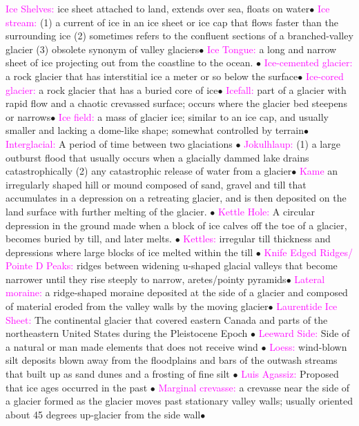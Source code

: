 \documentclass{article}
\newcommand{\ddd}{$\bullet$}
\newcommand{\pink}[1]{\textcolor{magenta}{#1}}
\newcommand{\vocab}[1]{{\pink{#1}}}
\begin{document}
\begin{multicols*}{4}
		\vocab{ Ice Shelves: }ice sheet attached to land, extends over sea, floats on water\ddd
		\vocab{        Ice stream: } (1) a current of ice in an ice sheet or ice cap that flows faster than the surrounding ice (2) sometimes refers to the confluent sections of a branched-valley glacier (3) obsolete synonym of valley glaciers\ddd
		\vocab{Ice Tongue: } a long and narrow sheet of ice projecting out from the coastline to the ocean. \ddd
		\vocab{        Ice-cemented glacier: } a rock glacier that has interstitial ice a meter or so below the surface\ddd
		\vocab{        Ice-cored glacier: } a rock glacier that has a buried core of ice\ddd
		\vocab{        Icefall: } part of a glacier with rapid flow and a chaotic crevassed surface; occurs where the glacier bed steepens or narrows\ddd
		\vocab{        Ice field: } a mass of glacier ice; similar to an ice cap, and usually smaller and lacking a dome-like shape; somewhat controlled by terrain\ddd
		\vocab{Interglacial: } A period of time between two glaciations \ddd
		\vocab{        Jokulhlaup: } (1) a large outburst flood that usually occurs when a glacially dammed lake drains catastrophically (2) any catastrophic release of water from a glacier\ddd
		\vocab{Kame} an irregularly shaped hill or mound composed of sand, gravel and till that accumulates in a depression on a retreating glacier, and is then deposited on the land surface with further melting of the glacier. \ddd
		\vocab{Kettle Hole: } A circular depression in the ground made when a block of ice calves off the toe of a glacier, becomes buried by till, and later melts. \ddd
		\vocab{Kettles: } irregular till thickness and depressions where large blocks of ice melted within the till \ddd
		\vocab{Knife Edged Ridges/ Pointe D Peaks: } ridges between widening u-shaped glacial valleys that become narrower until they rise steeply to narrow, aretes/pointy pyramids\ddd
		\vocab{        Lateral moraine: } a ridge-shaped moraine deposited at the side of a glacier and composed of material eroded from the valley walls by the moving glacier\ddd
		\vocab{Laurentide Ice Sheet: }The continental glacier that covered eastern Canada and parts of the northeastern United States during the Pleistocene Epoch \ddd
		\vocab{Leeward Side: }Side of a natural or man made elements that does not receive wind \ddd
		\vocab{Loess: } wind-blown silt deposits blown away from the floodplains and bars of the outwash streams that built up as sand dunes and a frosting of fine silt \ddd
		\vocab{Luis Agassiz: } Proposed that ice ages occurred in the past  \ddd
		\vocab{        Marginal crevasse: } a crevasse near the side of a glacier formed as the glacier moves past stationary valley walls; usually oriented about 45 degrees up-glacier from the side wall\ddd

\end{multicols*}
\end{document}
